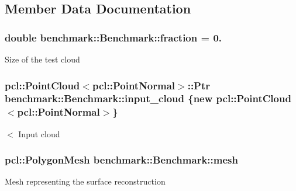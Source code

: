 \subsection{Member Data Documentation}
\subsubsection[{\texorpdfstring{fraction}{fraction}}]{\setlength{\rightskip}{0pt plus 5cm}double benchmark\+::\+Benchmark\+::fraction = 0.\hspace{0.3cm}{\ttfamily [private]}}\hypertarget{classbenchmark_1_1_benchmark_ac05259c7c78e7f7fd12c8c573e96871e}{}\label{classbenchmark_1_1_benchmark_ac05259c7c78e7f7fd12c8c573e96871e}
Size of the test cloud 
\subsubsection[{\texorpdfstring{input\+\_\+cloud}{input_cloud}}]{\setlength{\rightskip}{0pt plus 5cm}pcl\+::\+Point\+Cloud$<$pcl\+::\+Point\+Normal$>$\+::Ptr benchmark\+::\+Benchmark\+::input\+\_\+cloud \{new pcl\+::\+Point\+Cloud$<$pcl\+::\+Point\+Normal$>$\}\hspace{0.3cm}{\ttfamily [private]}}\hypertarget{classbenchmark_1_1_benchmark_a472d2ad851caafd323436e779ae68e56}{}\label{classbenchmark_1_1_benchmark_a472d2ad851caafd323436e779ae68e56}
$<$ Input cloud 
\subsubsection[{\texorpdfstring{mesh}{mesh}}]{\setlength{\rightskip}{0pt plus 5cm}pcl\+::\+Polygon\+Mesh benchmark\+::\+Benchmark\+::mesh\hspace{0.3cm}{\ttfamily [private]}}\hypertarget{classbenchmark_1_1_benchmark_ac909ac5421efc317d13cccbe8049879d}{}\label{classbenchmark_1_1_benchmark_ac909ac5421efc317d13cccbe8049879d}
Mesh representing the surface reconstruction 
